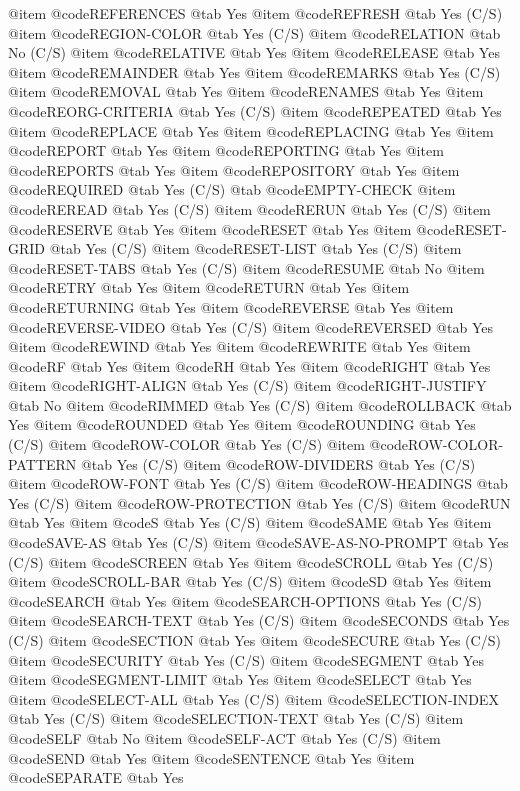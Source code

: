 @item @code{REFERENCES} @tab Yes
@item @code{REFRESH} @tab Yes (C/S)
@item @code{REGION-COLOR} @tab Yes (C/S)
@item @code{RELATION} @tab No (C/S)
@item @code{RELATIVE} @tab Yes
@item @code{RELEASE} @tab Yes
@item @code{REMAINDER} @tab Yes
@item @code{REMARKS} @tab Yes (C/S)
@item @code{REMOVAL} @tab Yes
@item @code{RENAMES} @tab Yes
@item @code{REORG-CRITERIA} @tab Yes (C/S)
@item @code{REPEATED} @tab Yes
@item @code{REPLACE} @tab Yes
@item @code{REPLACING} @tab Yes
@item @code{REPORT} @tab Yes
@item @code{REPORTING} @tab Yes
@item @code{REPORTS} @tab Yes
@item @code{REPOSITORY} @tab Yes
@item @code{REQUIRED} @tab Yes (C/S) @tab @code{EMPTY-CHECK}
@item @code{REREAD} @tab Yes (C/S)
@item @code{RERUN} @tab Yes (C/S)
@item @code{RESERVE} @tab Yes
@item @code{RESET} @tab Yes
@item @code{RESET-GRID} @tab Yes (C/S)
@item @code{RESET-LIST} @tab Yes (C/S)
@item @code{RESET-TABS} @tab Yes (C/S)
@item @code{RESUME} @tab No
@item @code{RETRY} @tab Yes
@item @code{RETURN} @tab Yes
@item @code{RETURNING} @tab Yes
@item @code{REVERSE} @tab Yes
@item @code{REVERSE-VIDEO} @tab Yes (C/S)
@item @code{REVERSED} @tab Yes
@item @code{REWIND} @tab Yes
@item @code{REWRITE} @tab Yes
@item @code{RF} @tab Yes
@item @code{RH} @tab Yes
@item @code{RIGHT} @tab Yes
@item @code{RIGHT-ALIGN} @tab Yes (C/S)
@item @code{RIGHT-JUSTIFY} @tab No
@item @code{RIMMED} @tab Yes (C/S)
@item @code{ROLLBACK} @tab Yes
@item @code{ROUNDED} @tab Yes
@item @code{ROUNDING} @tab Yes (C/S)
@item @code{ROW-COLOR} @tab Yes (C/S)
@item @code{ROW-COLOR-PATTERN} @tab Yes (C/S)
@item @code{ROW-DIVIDERS} @tab Yes (C/S)
@item @code{ROW-FONT} @tab Yes (C/S)
@item @code{ROW-HEADINGS} @tab Yes (C/S)
@item @code{ROW-PROTECTION} @tab Yes (C/S)
@item @code{RUN} @tab Yes
@item @code{S} @tab Yes (C/S)
@item @code{SAME} @tab Yes
@item @code{SAVE-AS} @tab Yes (C/S)
@item @code{SAVE-AS-NO-PROMPT} @tab Yes (C/S)
@item @code{SCREEN} @tab Yes
@item @code{SCROLL} @tab Yes (C/S)
@item @code{SCROLL-BAR} @tab Yes (C/S)
@item @code{SD} @tab Yes
@item @code{SEARCH} @tab Yes
@item @code{SEARCH-OPTIONS} @tab Yes (C/S)
@item @code{SEARCH-TEXT} @tab Yes (C/S)
@item @code{SECONDS} @tab Yes (C/S)
@item @code{SECTION} @tab Yes
@item @code{SECURE} @tab Yes (C/S)
@item @code{SECURITY} @tab Yes (C/S)
@item @code{SEGMENT} @tab Yes
@item @code{SEGMENT-LIMIT} @tab Yes
@item @code{SELECT} @tab Yes
@item @code{SELECT-ALL} @tab Yes (C/S)
@item @code{SELECTION-INDEX} @tab Yes (C/S)
@item @code{SELECTION-TEXT} @tab Yes (C/S)
@item @code{SELF} @tab No
@item @code{SELF-ACT} @tab Yes (C/S)
@item @code{SEND} @tab Yes
@item @code{SENTENCE} @tab Yes
@item @code{SEPARATE} @tab Yes
